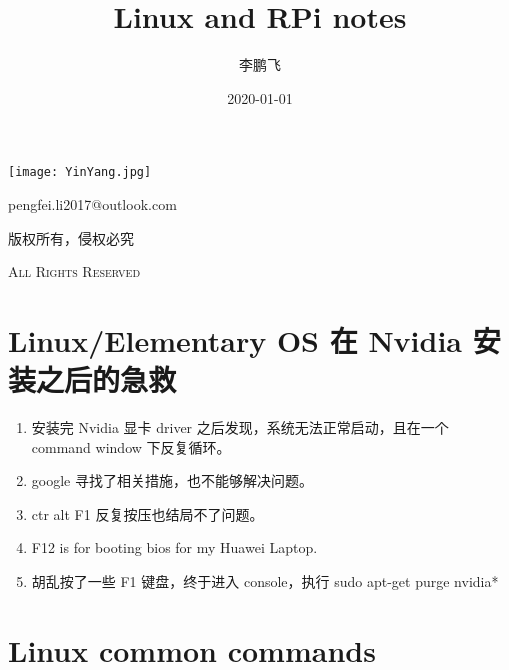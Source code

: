 \documentclass[UTF8,fancyhdr,a4paper]{ctexart}
\title{Linux and RPi notes}
\author{李鹏飞}
\date{2020-01-01}
\begin{document}
\begin{titlepage}
      \maketitle
      \centering
      \vspace{10cm}
      \texttt{[image: YinYang.jpg]}\par
      \vspace{1cm}
      {\huge pengfei.li2017@outlook.com}\par
      \vspace{0.5cm}
      {\small 版权所有，侵权必究}\par
      \vspace{0.5cm}
      {\scshape \small All Rights Reserved}
\end{titlepage}

\tableofcontents
{}%
\clearpage
\listoffigures
{}
\clearpage
\listoftables
{}
\clearpage




\newpage
{}
\section{Linux/Elementary OS 在 Nvidia 安装之后的急救}
\begin{enumerate}
      \item 安装完 Nvidia 显卡 driver 之后发现，系统无法正常启动，且在一个 command window 下反复循环。
      \item google 寻找了相关措施，也不能够解决问题。
      \item ctr alt F1 反复按压也结局不了问题。
      \item F12 is for booting bios for my Huawei Laptop.
      \item 胡乱按了一些 F1 键盘，终于进入 console，执行 sudo apt-get purge nvidia*

\end{enumerate}


\section{Linux common commands}
\end{document}
